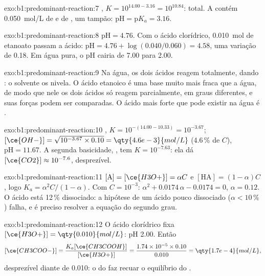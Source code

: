 \begin{solution}{exo:b1:predominant-reaction:7}
, $K = 10^{14.00 - 3.16} = 10^{10.84}$: total. A
 contém \qty{0.050}{mol/L} de  e de , um
tampão: $\mathrm{pH} = \mathrm{p}K_a = 3.16$.
\end{solution}

\begin{solution}{exo:b1:predominant-reaction:8}
$\mathrm{pH} = 4.76$. Com o ácido clorídrico, \qty{0.010}{mol} de
etanoato passam a ácido: $\mathrm{pH} = 4.76 + \log(0.040/0.060) = 4.58$, uma
variação de 0.18. Em água pura, o pH cairia de 7.00 para 2.00.
\end{solution}

\begin{solution}{exo:b1:predominant-reaction:9}
Na água, os dois ácidos reagem totalmente, dando : o solvente
os nivela. O ácido etanoico é uma base muito mais fraca que a água, de
modo que nele os dois ácidos só reagem parcialmente, em graus
diferentes, e suas forças podem ser comparadas. O ácido mais forte que
pode existir na água é .
\end{solution}

\begin{solution}{exo:b1:predominant-reaction:10}
, $K = 10^{-(14.00 - 10.33)} = 10^{-3.67}$;
$[\ce{OH-}] = \sqrt{10^{-3.67} \times 0.10} = \qty{4.6e-3}{mol/L}$ (4.6\,\%
de $C$), $\mathrm{pH} = 11.67$. A segunda basicidade, , tem $K = 10^{-7.63}$: ela dá $[\ce{CO2}] \approx
10^{-7.6}$, desprezível.
\end{solution}

\begin{solution}{exo:b1:predominant-reaction:11}
$[\mathrm{A}] = [\ce{H3O+}] = \alpha C$ e $[\mathrm{HA}] = (1 - \alpha)C$,
logo $K_a = \alpha^2C/(1 - \alpha)$. Com $C = 10^{-3}$: $\alpha^2 +
0.0174\,\alpha - 0.0174 = 0$, $\alpha = 0.12$. O ácido está 12\,\%
dissociado: a hipótese de um ácido pouco dissociado ($\alpha <
10\,\%$) falha, e é preciso resolver a equação do segundo grau.
\end{solution}

\begin{solution}{exo:b1:predominant-reaction:12}
O ácido clorídrico fixa $[\ce{H3O+}] = \qty{0.010}{mol/L}$: pH 2.00. Então
\[
  [\ce{CH3COO-}] = \frac{K_a[\ce{CH3COOH}]}{[\ce{H3O+}]} = \frac{1.74 \times 10^{-5}
  \times 0.10}{0.010} = \qty{1.7e-4}{mol/L},
\]
desprezível diante de 0.010: o
 do  faz recuar o equilíbrio do .
\end{solution}

